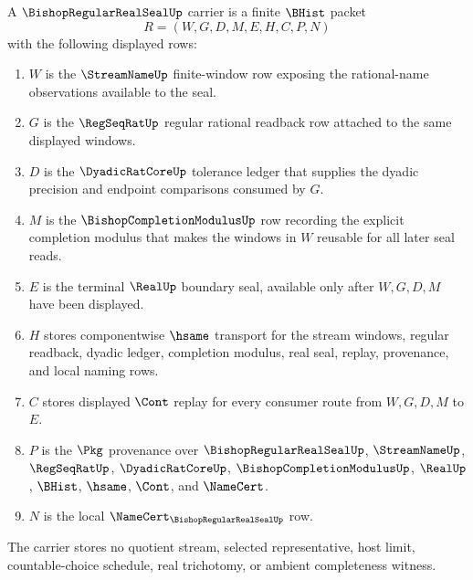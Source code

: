 \begin{definition}
\label{def:bishop-regular-real-seal-carrier}
A $\BishopRegularRealSealUp$ carrier is a finite $\BHist$ packet
$$
R=(W,G,D,M,E,H,C,P,N)
$$
with the following displayed rows:
\begin{enumerate}
\item $W$ is the $\StreamNameUp$ finite-window row exposing the rational-name observations available to the seal.
\item $G$ is the $\RegSeqRatUp$ regular rational readback row attached to the same displayed windows.
\item $D$ is the $\DyadicRatCoreUp$ tolerance ledger that supplies the dyadic precision and endpoint comparisons consumed by $G$.
\item $M$ is the $\BishopCompletionModulusUp$ row recording the explicit completion modulus that makes the windows in $W$ reusable for all later seal reads.
\item $E$ is the terminal $\RealUp$ boundary seal, available only after $W,G,D,M$ have been displayed.
\item $H$ stores componentwise $\hsame$ transport for the stream windows, regular readback, dyadic ledger, completion modulus, real seal, replay, provenance, and local naming rows.
\item $C$ stores displayed $\Cont$ replay for every consumer route from $W,G,D,M$ to $E$.
\item $P$ is the $\Pkg$ provenance over $\BishopRegularRealSealUp$, $\StreamNameUp$, $\RegSeqRatUp$, $\DyadicRatCoreUp$, $\BishopCompletionModulusUp$, $\RealUp$, $\BHist$, $\hsame$, $\Cont$, and $\NameCert$.
\item $N$ is the local $\NameCert_{\BishopRegularRealSealUp}$ row.
\end{enumerate}
The carrier stores no quotient stream, selected representative, host limit, countable-choice schedule, real trichotomy, or ambient completeness witness.
\end{definition}

